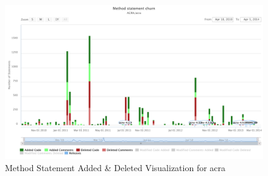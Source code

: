 


\begin{landscape}
\thispagestyle{empty}
 \begin{figure}
  \centering
        \includegraphics[width=1.5\textwidth]{images/statement_add_delete}
    \caption{Method Statement Added \& Deleted Visualization for acra}
    \label{fig:statement_add_delete_visual_acra}
 \end{figure}
\end{landscape}
\thispagestyle{plain}

